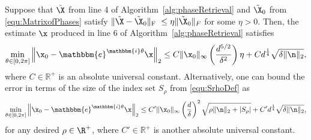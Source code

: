 \begin{thm}
Suppose that $\tilde{\X}$ from line 4 of Algorithm~\ref{alg:phaseRetrieval} and $\tilde{\X}_0$ from \eqref{equ:MatrixofPhases} satisfy $\Vert \tilde{\X} - \tilde{\X}_0 \Vert_{\rm F}~\leq \eta \Vert \tilde{\X}_0 \Vert_F$ for some $\eta>0$.
Then, the estimate $\x$ produced in line 6 of Algorithm~\ref{alg:phaseRetrieval} satisfies 
\[ \min_{\theta \in [0, 2 \pi]} \left\Vert  \x_0 - \mathbbm{e}^{\mathbbm{i} \theta} \x \right\Vert_2 \leq C \Vert \x_0 
        \Vert_{\infty} \left( \frac{d^{5/2}}{\delta^2} \right) \eta  + C  d^{\frac{1}{4}} \sqrt{\delta \| \n \|_2 },\]
where $C \in \mathbb{R}^+$ is an absolute universal constant.  Alternatively, one can bound the error in terms of the size of the index set $S_\rho$ from \eqref{equ:SrhoDef} as 
\begin{equation}
\min_{\theta \in [0, 2 \pi]} \left\Vert  \x_0 - \mathbbm{e}^{\mathbbm{i} \theta} \x \right\Vert_2 \leq C' \Vert \x_0 
        \Vert_{\infty} \left( \frac{d}{\delta} \right)^2 \sqrt{\rho \| \n \|_2 + \left| S_\rho \right|} + C' d^{\frac{1}{4}} \sqrt{\delta \| \n \|_2 }, \label{equ:ManRes2} 
\end{equation}
for any desired $\rho \in \R^+$, where $C' \in \mathbb{R}^+$ is another absolute universal constant.
\label{thm:MainRes}
\end{thm}

